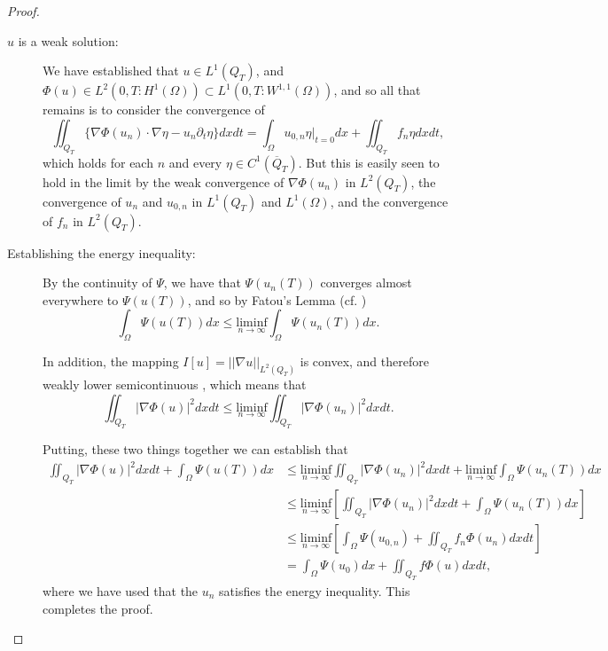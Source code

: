 \documentclass[11pt, a4paper]{article}
\begin{document}
\begin{proof}
\begin{description}
\item[$u$ is a weak solution:]
We have established that $u \in L^1(Q_T)$, and $\Phi(u) \in L^2(0,T: H^1(\Omega)) \subset L^1(0,T: W^{1,1}(\Omega))$, and so all that remains is to consider the convergence of
\begin{equation}
\iint_{Q_T} \{ \nabla\Phi(u_n) \cdot \nabla \eta - u_n \partial_t \eta \} dxdt = \int_\Omega u_{0,n}\eta\big|_{t=0}dx + \iint_{Q_T} f_n \eta dxdt,
\end{equation}
which holds for each $n$ and every $\eta \in C^1(\overline{Q}_T)$. But this is easily seen to hold in the limit by the weak convergence of $\nabla \Phi(u_n)$ in $L^2(Q_T)$, the convergence of $u_n$ and $u_{0,n}$ in $L^1(Q_T)$ and $L^1(\Omega)$, and the convergence of $f_n$ in $L^2(Q_T)$.

\item[Establishing the energy inequality:]
By the continuity of $\Psi$, we have that $\Psi(u_n(T))$ converges almost everywhere to $\Psi(u(T))$, and so by Fatou's Lemma (cf. \citep[p. 126]{weiss1999course}) 
\begin{equation*}
\int_\Omega \Psi(u(T))dx \leq \underset{n \to \infty}{\mathrm{liminf}}\int_\Omega \Psi(u_n(T))dx. 
\end{equation*}

In addition, the mapping $I[u] = ||\nabla u||_{L^2(Q_T)}$ is convex, and therefore weakly lower semicontinuous \citep[p. 468]{evans}, which means that
\begin{equation*}
\iint_{Q_T} |\nabla \Phi(u) |^2 dxdt \leq  \underset{n \to \infty}{\mathrm{liminf}} \iint_{Q_T} |\nabla \Phi(u_n)|^2 dxdt.
\end{equation*}

Putting, these two things together we can establish that
\begin{align*}
\iint_{Q_T} |\nabla \Phi(u) |^2 dxdt + \int_\Omega \Psi(u(T))dx &\leq \underset{n \to \infty}{\mathrm{liminf}} \iint_{Q_T} |\nabla \Phi(u_n)|^2 dxdt + \underset{n \to \infty}{\mathrm{liminf}}\int_\Omega \Psi(u_n(T))dx \\
&\leq \underset{n \to \infty}{\mathrm{liminf}} \left[ \iint_{Q_T} |\nabla \Phi(u_n)|^2 dxdt + \int_\Omega \Psi(u_n(T))dx \right] \\
&\leq \underset{n \to \infty}{\mathrm{liminf}}\left[ \int_\Omega \Psi(u_{0,n}) + \iint_{Q_T}f_n \Phi(u_n)dxdt \right] \\
&= \int_\Omega \Psi(u_0)dx + \iint_{Q_T} f\Phi(u)dxdt,
\end{align*}
where we have used that the $u_n$ satisfies the energy inequality. This completes the proof.

\end{description}
\end{proof}
\end{document}
